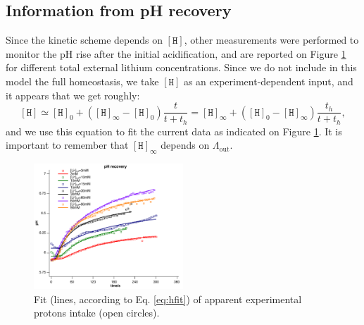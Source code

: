 \documentclass[aps,onecolumn,11pt]{revtex4}
\newcommand{\mychem}[1]{\mathtt{#1}}
\newcommand{\myconc}[1]{\left\lbrack{#1}\right\rbrack}
\newcommand{\spproton}{\mychem{H}}
\newcommand{\proton}{\myconc{\spproton}}
\newcommand{\LiAll}{\Lambda}
\newcommand{\LiAllOut}{{\LiAll}_{\mathrm{out}}}
\begin{document}
\subsection{Information from pH recovery}
Since the kinetic scheme depends on $\proton$, other measurements were performed to monitor the pH rise after the initial acidification, 
and are reported on Figure \ref{fig:protons} for different total external lithium concentrations. Since we do not include in this model the full homeostasis,
we take $\proton$ as an experiment-dependent input, and it appears that we get roughly:
\begin{equation}
\label{eq:hfit}
	\proton \simeq \proton_0 + \left(\proton_\infty-\proton_0\right) \dfrac{t}{t+t_h} = \proton_\infty + \left(\proton_0 - \proton_\infty\right) \dfrac{t_h}{t+t_h},
\end{equation}
and we use this equation to fit the current data as indicated on Figure \ref{fig:protons}. It is important to remember that $\proton_\infty$ depends on $\LiAllOut$.

\begin{figure}[!ht]
\begin{center}
\includegraphics[width=0.5\textwidth]{protons.pdf}
\end{center}
\caption{\label{fig:protons} Fit (lines, according to Eq. \eqref{eq:hfit}) of apparent experimental protons intake (open circles).}
\end{figure}
\end{document}
